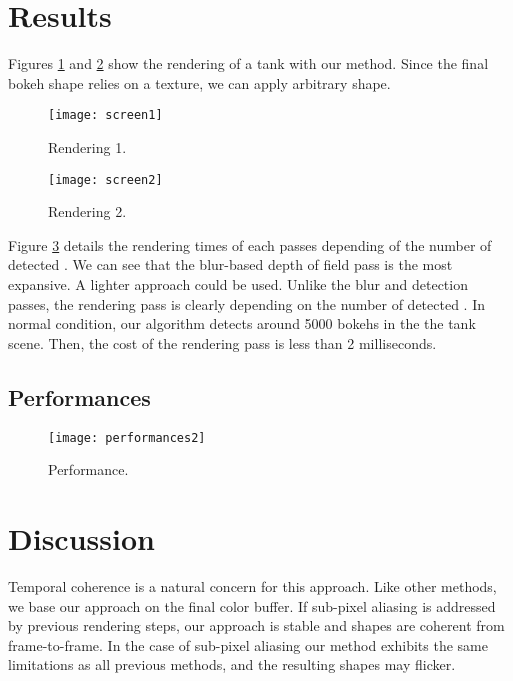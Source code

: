 \section{Results}
Figures \ref{DeRousiers:screen1} and \ref{DeRousiers:screen2} show the rendering of a tank with our method. Since the final bokeh shape relies on a texture, we can apply arbitrary shape.

	\begin{figure}[htb]\centering
	\texttt{[image: screen1]}
	\caption{Rendering 1.}
	\label{DeRousiers:screen1}
	\end{figure}

	\begin{figure}[htb]\centering
	\texttt{[image: screen2]}
	\caption{Rendering 2.}
	\label{DeRousiers:screen2}
	\end{figure}

Figure \ref{DeRousiers:performance} details the rendering times of each passes depending of the number of detected \bokehs. We can see that the blur-based depth of field pass is the most expansive. A lighter approach could be used. Unlike the blur and detection passes, the rendering pass is clearly depending on the number of detected \bokeh. In normal condition, our algorithm detects around 5000 bokehs in the the tank scene. Then, the cost of the rendering pass is less than 2 milliseconds.

\subsection{Performances}
	\begin{figure}[htb]\centering
	\texttt{[image: performances2]}
	\caption{Performance.}
	\label{DeRousiers:performance}
	\end{figure}

\section{Discussion}
Temporal coherence is a natural concern for this approach. Like other methods, we base our approach on the final color buffer. If sub-pixel aliasing is addressed by previous rendering steps, our approach is stable and \bokeh shapes are coherent from frame-to-frame. In the case of sub-pixel aliasing our method exhibits the same limitations as all previous methods, and the resulting \bokeh shapes may flicker.

